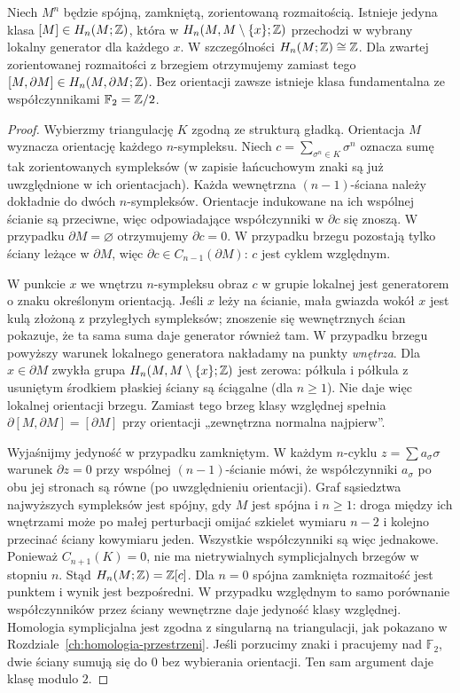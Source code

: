 \begin{twierdzenie}
\label{thm:klasa-fundamentalna-16}
Niech $M^n$ będzie spójną, zamkniętą,
zorientowaną rozmaitością. Istnieje
jedyna klasa
$[M]\in H_n(M;\mathbb{Z})$, która w
$H_n(M,M\setminus\{x\};\mathbb{Z})$
przechodzi w wybrany lokalny
generator dla każdego $x$.
W szczególności $H_n(M;\mathbb{Z})\cong\mathbb{Z}$.
Dla zwartej zorientowanej rozmaitości z brzegiem
otrzymujemy zamiast tego
$[M,\partial M]\in H_n(M,\partial M;\mathbb{Z})$.
Bez orientacji zawsze istnieje
klasa fundamentalna ze
współczynnikami $\mathbb F_2=\mathbb{Z}/2$.
\end{twierdzenie}
\begin{proof}
Wybierzmy triangulację $K$ zgodną
ze strukturą gładką. Orientacja $M$
wyznacza orientację każdego
$n$-sympleksu. Niech
$c=\sum_{\sigma^n\in K}\sigma^n$
oznacza sumę tak zorientowanych
sympleksów (w zapisie łańcuchowym
znaki są już uwzględnione w ich
orientacjach). Każda wewnętrzna
$(n-1)$-ściana należy dokładnie
do dwóch $n$-sympleksów.
Orientacje indukowane na ich
wspólnej ścianie są przeciwne,
więc odpowiadające współczynniki
w $\partial c$ się znoszą.
W przypadku $\partial M=\varnothing$
otrzymujemy $\partial c=0$.
W przypadku brzegu pozostają tylko
ściany leżące w $\partial M$,
więc $\partial c\in C_{n-1}(\partial M)$:
$c$ jest cyklem względnym.

W punkcie $x$ we wnętrzu
$n$-sympleksu obraz $c$ w
grupie lokalnej jest generatorem
o znaku określonym orientacją.
Jeśli $x$ leży na ścianie,
mała gwiazda wokół $x$ jest
kulą złożoną z przyległych
sympleksów; znoszenie się
wewnętrznych ścian pokazuje,
że ta sama suma daje generator
również tam. W przypadku brzegu powyższy warunek lokalnego
generatora nakładamy na punkty \emph{wnętrza}.
Dla $x\in\partial M$ zwykła grupa
$H_n(M,M\setminus\{x\};\mathbb{Z})$ jest zerowa:
półkula i półkula z usuniętym środkiem płaskiej ściany
są ściągalne (dla $n\geq1$). Nie daje więc lokalnej
orientacji brzegu. Zamiast tego brzeg klasy względnej
spełnia $\partial[M,\partial M]=[\partial M]$
przy orientacji „zewnętrzna normalna najpierw”.

Wyjaśnijmy jedyność w przypadku
zamkniętym. W każdym $n$-cyklu
$z=\sum a_\sigma\sigma$ warunek
$\partial z=0$ przy wspólnej
$(n-1)$-ścianie mówi, że
współczynniki $a_\sigma$ po obu
jej stronach są równe
(po uwzględnieniu orientacji).
Graf sąsiedztwa najwyższych
sympleksów jest spójny,
gdy $M$ jest spójna i $n\geq1$:
droga między ich wnętrzami
może po małej perturbacji
omijać szkielet wymiaru
$n-2$ i kolejno przecinać
ściany kowymiaru jeden.
Wszystkie współczynniki są
więc jednakowe. Ponieważ
$C_{n+1}(K)=0$, nie ma
nietrywialnych symplicjalnych
brzegów w stopniu $n$.
Stąd $H_n(M;\mathbb{Z})=\mathbb{Z}[c]$. Dla $n=0$ spójna
zamknięta rozmaitość jest punktem i wynik jest bezpośredni.
W przypadku względnym to samo porównanie współczynników
przez ściany wewnętrzne daje jedyność klasy względnej.
Homologia symplicjalna jest
zgodna z singularną na
triangulacji, jak pokazano
w Rozdziale~\ref{ch:homologia-przestrzeni}.
Jeśli porzucimy znaki i pracujemy
nad $\mathbb F_2$, dwie ściany
sumują się do $0$ bez wybierania
orientacji. Ten sam argument
daje klasę modulo $2$.
\end{proof}

